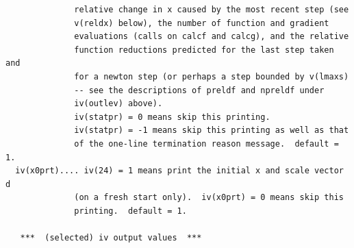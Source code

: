 \documentclass[11pt,twoside]{article}
\begin{document}
\begin{verbatim}
              relative change in x caused by the most recent step (see
              v(reldx) below), the number of function and gradient
              evaluations (calls on calcf and calcg), and the relative
              function reductions predicted for the last step taken and
              for a newton step (or perhaps a step bounded by v(lmaxs)
              -- see the descriptions of preldf and npreldf under
              iv(outlev) above).
              iv(statpr) = 0 means skip this printing.
              iv(statpr) = -1 means skip this printing as well as that
              of the one-line termination reason message.  default = 1.
  iv(x0prt).... iv(24) = 1 means print the initial x and scale vector d
              (on a fresh start only).  iv(x0prt) = 0 means skip this
              printing.  default = 1.
 
   ***  (selected) iv output values  ***
 

\end{verbatim}
\end{document}
